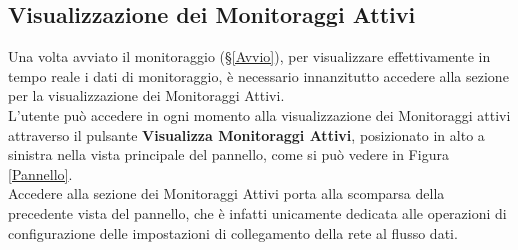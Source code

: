 \subsection{Visualizzazione dei Monitoraggi Attivi}\label{MonitoraggiAttivi}

Una volta avviato il monitoraggio (§\ref{Avvio}), per visualizzare effettivamente in tempo reale i dati di monitoraggio, è necessario innanzitutto accedere alla sezione per la visualizzazione dei Monitoraggi Attivi.\\
L'utente può accedere in ogni momento alla visualizzazione dei Monitoraggi attivi attraverso il pulsante \textbf{Visualizza Monitoraggi Attivi}, posizionato in alto a sinistra nella vista principale del pannello, come si può vedere in Figura \ref{Pannello}.\\

Accedere alla sezione dei Monitoraggi Attivi porta alla scomparsa della precedente vista del pannello, che è infatti unicamente dedicata alle operazioni di configurazione delle impostazioni di collegamento della rete al flusso dati.
